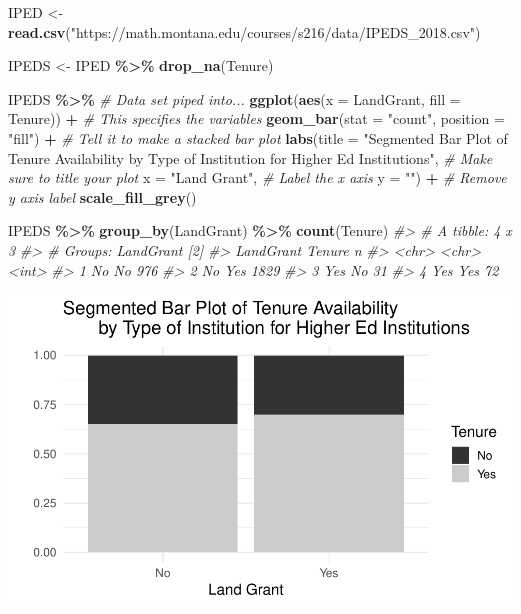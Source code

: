 \documentclass[
]{report}
\newenvironment{Shaded}{\begin{snugshade}}{\end{snugshade}}
\newcommand{\AttributeTok}[1]{\textcolor[rgb]{0.13,0.29,0.53}{#1}}
\newcommand{\CommentTok}[1]{\textcolor[rgb]{0.56,0.35,0.01}{\textit{#1}}}
\newcommand{\FunctionTok}[1]{\textcolor[rgb]{0.13,0.29,0.53}{\textbf{#1}}}
\newcommand{\NormalTok}[1]{#1}
\newcommand{\OtherTok}[1]{\textcolor[rgb]{0.56,0.35,0.01}{#1}}
\newcommand{\SpecialCharTok}[1]{\textcolor[rgb]{0.81,0.36,0.00}{\textbf{#1}}}
\newcommand{\StringTok}[1]{\textcolor[rgb]{0.31,0.60,0.02}{#1}}
\begin{document}
\begin{Shaded}
\begin{Highlighting}[]
\NormalTok{IPED }\OtherTok{\textless{}{-}}\FunctionTok{read.csv}\NormalTok{(}\StringTok{"https://math.montana.edu/courses/s216/data/IPEDS\_2018.csv"}\NormalTok{)}

\NormalTok{IPEDS }\OtherTok{\textless{}{-}}\NormalTok{ IPED }\SpecialCharTok{\%\textgreater{}\%}
    \FunctionTok{drop\_na}\NormalTok{(Tenure)}

\NormalTok{IPEDS }\SpecialCharTok{\%\textgreater{}\%} \CommentTok{\# Data set piped into...}
    \FunctionTok{ggplot}\NormalTok{(}\FunctionTok{aes}\NormalTok{(}\AttributeTok{x =}\NormalTok{ LandGrant, }\AttributeTok{fill =}\NormalTok{ Tenure)) }\SpecialCharTok{+}   \CommentTok{\# This specifies the variables}
  \FunctionTok{geom\_bar}\NormalTok{(}\AttributeTok{stat =} \StringTok{"count"}\NormalTok{, }\AttributeTok{position =} \StringTok{"fill"}\NormalTok{) }\SpecialCharTok{+}  \CommentTok{\# Tell it to make a stacked bar plot}
  \FunctionTok{labs}\NormalTok{(}\AttributeTok{title =} \StringTok{"Segmented Bar Plot of Tenure Availability }
\StringTok{       by Type of Institution for Higher Ed Institutions"}\NormalTok{,  }
       \CommentTok{\# Make sure to title your plot }
       \AttributeTok{x =} \StringTok{"Land Grant"}\NormalTok{,   }\CommentTok{\# Label the x axis}
       \AttributeTok{y =} \StringTok{""}\NormalTok{) }\SpecialCharTok{+} \CommentTok{\# Remove y axis label }
    \FunctionTok{scale\_fill\_grey}\NormalTok{()}

\NormalTok{IPEDS }\SpecialCharTok{\%\textgreater{}\%} \FunctionTok{group\_by}\NormalTok{(LandGrant) }\SpecialCharTok{\%\textgreater{}\%} \FunctionTok{count}\NormalTok{(Tenure)}
\CommentTok{\#\textgreater{} \# A tibble: 4 x 3}
\CommentTok{\#\textgreater{} \# Groups:   LandGrant [2]}
\CommentTok{\#\textgreater{}   LandGrant Tenure     n}
\CommentTok{\#\textgreater{}   \textless{}chr\textgreater{}     \textless{}chr\textgreater{}  \textless{}int\textgreater{}}
\CommentTok{\#\textgreater{} 1 No        No       976}
\CommentTok{\#\textgreater{} 2 No        Yes     1829}
\CommentTok{\#\textgreater{} 3 Yes       No        31}
\CommentTok{\#\textgreater{} 4 Yes       Yes       72}
\end{Highlighting}
\end{Shaded}

\begin{center}\includegraphics[width=0.7\linewidth]{09-LN010-two-cat-theory_files/figure-latex/unnamed-chunk-1-1} \end{center}
\end{document}
